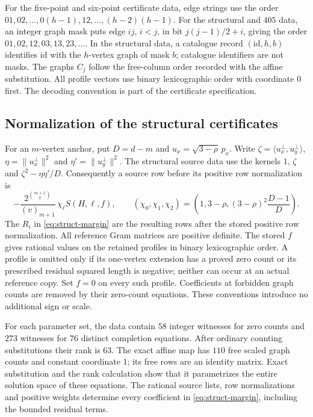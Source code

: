 \documentclass[11pt]{article}
\theoremstyle{remark}
\numberwithin{equation}{section}
\begin{document}
For the five-point and six-point certificate data,
edge strings use the order
$01,02,\ldots,0(h-1),12,\ldots,(h-2)(h-1)$.
For the structural and $405$ data, an integer graph mask puts edge $ij$,
$i<j$, in bit $j(j-1)/2+i$, giving the order
$01,02,12,03,13,23,\ldots$.
In the structural data, a catalogue record $(\mathrm{id},h,b)$
identifies $\mathrm{id}$ with the $h$-vertex graph of mask $b$;
catalogue identifiers are not masks. The graphs $C_j$ follow the
free-column order recorded with the affine substitution.
All profile vectors use binary lexicographic order with coordinate $0$
first. The decoding convention is part of the certificate specification.

\subsection{Normalization of the structural certificates}
\label{app:structural-normalization}
For an $m$-vertex anchor, put $D=d-m$ and
$u_x=\sqrt{3-\rho}\,p_x$. Write
$\zeta=\langle u_x^\perp,u_y^\perp\rangle$,
$\eta=\|u_x^\perp\|^2$ and $\eta'=\|u_y^\perp\|^2$.
The structural source data use the kernels
$1$, $\zeta$ and $\zeta^2-\eta\eta'/D$.
Consequently a source row before its positive row normalization is
\[
 -\frac{2^{\binom{m+1}{2}}}{(v)_{m+1}}\,
 \chi_\ell S(H,\ell,f),\qquad
 (\chi_0,\chi_1,\chi_2)=
 \left(1,3-\rho,(3-\rho)^2\frac{D-1}{D}\right).
\]
The $R_i$ in \eqref{eq:struct-margin} are the resulting rows after
the stored positive row normalization.
All reference Gram matrices are positive definite. The stored $f$ gives
rational values on the retained profiles in binary lexicographic order.
A profile is omitted only if its one-vertex extension has a proved zero
count or its prescribed residual squared length is negative; neither
can occur at an actual reference copy. Set $f=0$ on every such profile.
Coefficients at forbidden graph counts are removed by their zero-count
equations. These conventions introduce no additional sign or scale.

For each parameter set, the data contain $58$ integer witnesses for
zero counts and $273$ witnesses for $76$ distinct completion equations.
After ordinary counting substitutions their rank is $63$. The exact
affine map has $110$ free scaled graph counts and constant coordinate $1$;
its free rows are an identity matrix. Exact substitution and the rank
calculation show that it parametrizes the entire solution space of
these equations. The rational source lists, row normalizations and
positive weights determine every coefficient in
\eqref{eq:struct-margin}, including the bounded residual terms.
\end{document}
